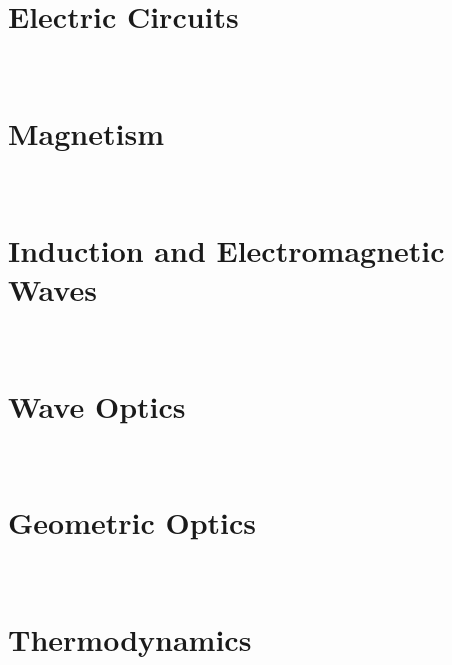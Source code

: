 \documentclass[english,twoside]{labmanual} %
\begin{document}
\part{Electric Circuits}
\


	
	


	
	

\part{Magnetism}
\
	


	
	


\part{Induction and Electromagnetic Waves}
\





\part{Wave Optics}
\


	
	


\part{Geometric Optics}
\
	
	

\part{Thermodynamics}
\
	
	
	
	
	



	

	
	
\end{document}
